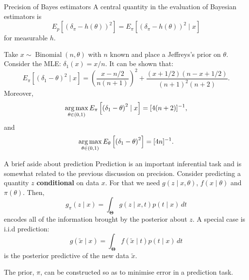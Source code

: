\begin{frame}{Precision of Bayes estimators}
 A central quantity in the evaluation of Bayesian estimators is
 \begin{equation}
  \label{eq:bayes_risk}
  E_p\left[\left(\delta_\pi - h(\theta)\right)^2\right] = E_{\pi}\left[\left(\delta_\pi - h(\theta)\right)^2 \mid x \right]
 \end{equation}
for measurable $h$.
\begin{example}
 Take $x \sim \operatorname{Binomial}(n, \theta)$ with $n$ known and place a Jeffreys's prior on $\theta$.
 Consider the MLE: $\delta_1(x) = x/n$.
 It can be shown that:
 $$ E_\pi\left[\left(\delta_1 - \theta \right)^2 \mid x \right] = \left(\frac{x - n/2}{n(n+1)}\right)^2 +  \frac{(x + 1/2)(n - x + 1/2)}{(n + 1)^2(n+2)}.$$
 Moreover,
 $$\operatorname*{arg\,max}_{\theta \in (0, 1)}  E_\pi\left[\left(\delta_1 - \theta\right)^2 \mid x \right] = [4(n+2)]^{-1},$$
 and
 $$ \operatorname*{arg\,max}_{\theta \in (0, 1)} E_\theta \left[\left(\delta_1 - \theta\right)^2\right] = [4n]^{-1}.$$ 
\end{example}
\end{frame}
\begin{frame}{A brief aside about prediction}
 Prediction is an important inferential task and is somewhat related to the previous discussion on precision.
 Consider predicting a quantity $z$ \textbf{conditional} on data $x$.
 For that  we need $g(z \mid x, \theta)$, $f(x\mid \theta)$ and $\pi(\theta)$.
 Then,
 \begin{equation}
  \label{eq:general_predictive}
  g_\pi(z\mid x) = \int_{\boldsymbol{\Theta}} g(z\mid x, t) p(t \mid x)\,dt
 \end{equation}
encodes all of the information brought by the posterior about $z$.
A special case  is i.i.d prediction:
\begin{equation}
 \label{eq:posterior_predictive_data}
 g(\tilde{x} \mid x) = \int_{\boldsymbol{\Theta}} f(\tilde{x} \mid t) p(t \mid x)\,dt
\end{equation}
is the posterior predictive of the new data $\tilde{x}$.
\begin{idea}
\label{idea:prediction_calibrated_priors}
The prior, $\pi$, can be constructed so as to minimise error in a prediction task. 
\end{idea}
\end{frame}
